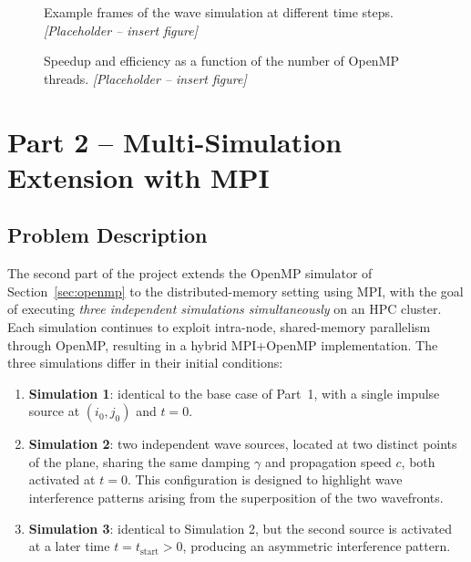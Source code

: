 \documentclass[10pt,twocolumn]{article}
\begin{document}
\begin{figure}[h]
\centering
\caption{Example frames of the wave simulation at different time steps. \textit{[Placeholder -- insert figure]}}
\label{fig:part1-frames}
\end{figure}

\begin{figure}[h]
\centering
\caption{Speedup and efficiency as a function of the number of OpenMP threads. \textit{[Placeholder -- insert figure]}}
\label{fig:part1-speedup}
\end{figure}

\section{Part 2 -- Multi-Simulation Extension with MPI}
\label{sec:mpi}

\subsection{Problem Description}
The second part of the project extends the OpenMP simulator of Section~\ref{sec:openmp} to
the distributed-memory setting using MPI, with the goal of executing \emph{three independent
simulations simultaneously} on an HPC cluster. Each simulation continues to exploit
intra-node, shared-memory parallelism through OpenMP, resulting in a hybrid MPI+OpenMP
implementation. The three simulations differ in their initial conditions:

\begin{enumerate}[label=(\roman*)]
    \item \textbf{Simulation 1}: identical to the base case of Part~1, with a single impulse
    source at $(i_0,j_0)$ and $t=0$.
    \item \textbf{Simulation 2}: two independent wave sources, located at two distinct points
    of the plane, sharing the same damping $\gamma$ and propagation speed $c$, both activated
    at $t=0$. This configuration is designed to highlight wave interference patterns arising
    from the superposition of the two wavefronts.
    \item \textbf{Simulation 3}: identical to Simulation 2, but the second source is activated
    at a later time $t = t_{\text{start}} > 0$, producing an asymmetric interference pattern.
\end{enumerate}
\end{document}

